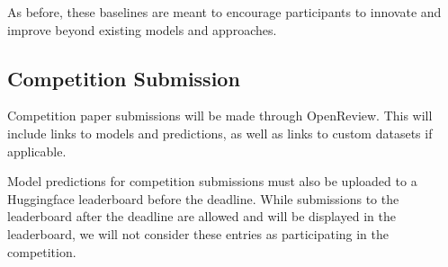 \documentclass[11pt]{article}
\newcommand{\strict}[1]{\textsc{Strict}}
\newcommand{\strictsmall}[1]{\textsc{Strict-small}}
\newcommand{\vision}[1]{\textsc{Multimodal}}
\begin{document}
As before, these baselines are meant to encourage participants to innovate and improve beyond existing models and approaches.



\subsection{Competition Submission %
}


Competition paper submissions will be made through OpenReview. This will include links to models and predictions, as well as links to custom datasets if applicable.

Model predictions for competition submissions must also be uploaded to a Huggingface leaderboard before the deadline. While submissions to the leaderboard after the deadline are allowed and will be displayed in the leaderboard, we will not consider these entries as participating in the competition.
\end{document}
